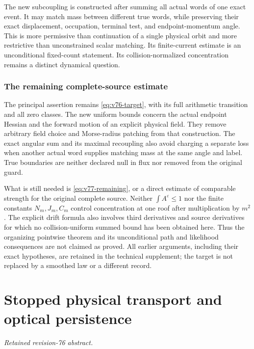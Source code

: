 \documentclass[11pt,reqno]{amsart}
\numberwithin{equation}{section}
\theoremstyle{definition}\newtheorem{definition}[theorem]{Definition}
\theoremstyle{remark}\newtheorem{remark}[theorem]{Remark}
\theoremstyle{definition}\newtheorem{inputstatement}[theorem]{Input statement}
\begin{document}
The new subcoupling is constructed after summing all actual words of
one exact event. It may match mass between different true words,
while preserving their exact displacement, occupation, terminal test,
and endpoint-momentum angle. This is more permissive than continuation
of a single physical orbit and more restrictive than unconstrained
scalar matching. Its finite-current estimate is an unconditional
fixed-count statement. Its collision-normalized concentration remains
a distinct dynamical question.





\section{The remaining complete-source estimate}
The principal assertion remains \eqref{eq:v76-target}, with its full
arithmetic transition and all zero classes. The new uniform bounds
concern the actual endpoint Hessian and the forward motion of an
explicit physical field. They remove arbitrary field choice and
Morse-radius patching from that construction. The exact angular
sum and its maximal recoupling also avoid charging a separate loss
when another actual word supplies matching mass at the same angle
and label. True boundaries are neither declared null in flux nor
removed from the original guard.

What is still needed is \eqref{eq:v77-remaining}, or a direct estimate
of comparable strength for the original complete source. Neither
$\int A^\varepsilon\le1$ nor the finite constants $N_m,J_m,C_m$
control concentration at one roof after multiplication by $m^2$.
The explicit drift formula also involves third derivatives and source
derivatives for which no collision-uniform summed bound has been
obtained here. Thus the organizing pointwise theorem and its
unconditional path and likelihood consequences are not claimed as
proved. All earlier arguments, including their exact hypotheses,
are retained in the technical supplement; the target is not replaced
by a smoothed law or a different record.


\endgroup
\part{Stopped physical transport and optical persistence}
\paragraph{Retained revision-76 abstract.}
\end{document}
